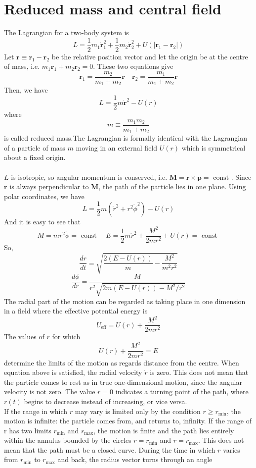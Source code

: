 \section{Reduced mass and central field}
The Lagrangian for a two-body system is
\[L = \frac{1}{2} m_1 \dot{\bm{r}}_1^2 + \frac{1}{2} m_2 \dot{\bm{r}}_2^2 + U(|\bm{r}_1 - \bm{r}_2|)\]
Let $\bm{r} \equiv \bm{r}_1 -\bm{r}_2 $ be the relative position vector and let the origin be at the centre of mass, i.e. $m_1\bm{r}_1 + m_2\bm{r}_2 = 0$. These two equations give
\[\bm{r}_1 = \frac{m_2}{m_1+m_2}\bm{r} \quad \bm{r}_2 = \frac{m_1}{m_1+m_2}\bm{r}\]
Then, we have
\[L = \frac{1}{2} m \dot{\bm{r}}^2 - U(r)\]
where
\[m \equiv \frac{m_1m_2}{m_1+m_2}\]
is called reduced mass.The Lagrangian is formally identical with the Lagrangian of a particle of mass $m$ moving in an external field $U(r)$ which is symmetrical about a fixed origin. \\ \\
$L$ is isotropic, so angular momentum is conserved, i.e. $\bm{M} = \bm{r} \times \bm{p} = \mbox{ const }$. Since $\bm{r}$ is always perpendicular to $\bm{M}$, the path of the particle lies in one plane. Using polar coordinates, we have
\[L = \frac{1}{2}m(\dot{r}^2 + r^2 \dot{\phi}^2)-U(r)\]
And it is easy to see that
\[M = mr^2\dot{\phi} = \mbox{ const } \quad E = \frac{1}{2}m \dot{r}^2 + \frac{M^2}{2mr^2} + U(r) = \mbox{ const }\]
So,
\[\frac{dr}{dt} = \sqrt{\frac{2(E-U(r))}{m} - \frac{M^2}{m^2r^2}}\]
\[\frac{d\phi}{dr} = \frac{M}{r^2 \sqrt{2m(E-U(r))-M^2/r^2}}\]
The radial part of the motion can be regarded as taking place in one dimension in a field where the effective potential energy is
\[U_{\mathrm{eff}} = U(r) + \frac{M^2}{2mr^2}\]
The values of $r$ for which
\[U(r) + \frac{M^2}{2mr^2} = E\]
determine the limits of the motion as regards distance from the centre. When equation above is satisfied, the radial velocity $\dot{r}$ is zero. This does not mean that the particle comes to rest as in true one-dimensional motion, since the angular velocity is not zero. The value $\dot{r} = 0$ indicates a turning point of the path, where $r(t)$ begins to decrease instead of increasing, or vice versa.\\ 
If the range in which $r$ may vary is limited only by the condition $r \ge r_{\mathrm{min}}$, the motion is infinite: the particle comes from, and returns to, infinity.
If the range of r has two limits $r_{\mathrm{min}}$ and $r_{\mathrm{max}}$, the motion is finite and the path lies entirely within the annulus bounded by the circles $r = r_{\mathrm{min}}$ and $r = r_{\mathrm{max}}$. This does not mean that the path must be a closed curve. During the time in which $r$ varies from $r_{\mathrm{min}}$ to $r_{\mathrm{max}}$ and back, the radius vector turns through an angle
